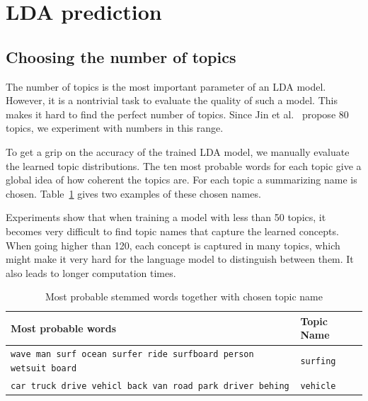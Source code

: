 \documentclass[twoside,twocolumn]{article}
\begin{document}
	
	
	
	
	
	\clearpage
	\appendix
	\section{LDA prediction}
	\label{appendix:LDA}
	\subsection{Choosing the number of topics}
	The number of topics is the most important parameter of an LDA model. However, it is a nontrivial task to evaluate the quality of such a model. This makes it hard to find the perfect number of topics. Since Jin et al.~\cite{Jin2015} propose 80 topics, we experiment with numbers in this range.
	
	To get a grip on the accuracy of the trained LDA model, we manually evaluate the learned topic distributions. The ten most probable words for each topic give a global idea of how coherent the topics are. For each topic a summarizing name is chosen. Table~\ref{tbl:woorden-naar-topic} gives two examples of these chosen names.
	
	Experiments show that when training a model with less than 50 topics, it becomes very difficult to find topic names that capture the learned concepts. When going higher than 120, each concept is captured in many topics, which might make it very hard for the language model to distinguish between them. It also leads to longer computation times. 
	
	\begin{table}[!t]
		\centering
		\begin{tabular}{ll}
			Most probable words                                               & Topic Name \\ \hline
			\texttt{\small{wave man surf ocean surfer ride surfboard person wetsuit board}} & \texttt{surfing}       \\
			\texttt{\small{car truck drive vehicl back van road park driver behing}}        & \texttt{vehicle}      \\
		\end{tabular}
		\caption{Most probable stemmed words together with chosen topic name}	\label{tbl:woorden-naar-topic}
	\end{table}
	
\end{document}
